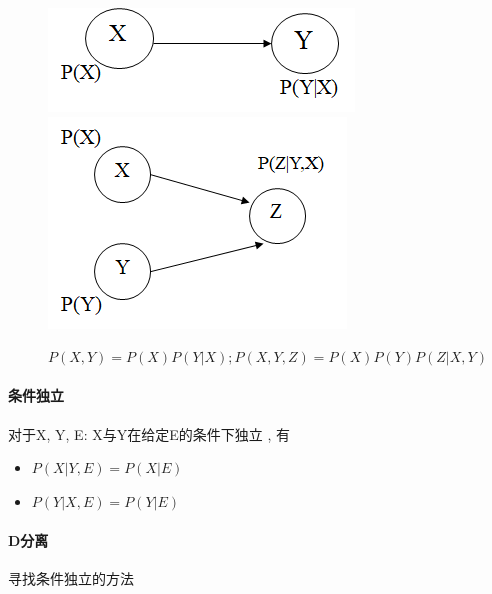 \documentclass[UTF8,a4paper]{ctexart}
\begin{document}
\begin{figure}[H]
	\centering
	\includegraphics[scale = 0.3]{assets/ArtificialIntelligence/2018-01-08-23-03-30.png}
	\includegraphics[scale = 0.3]{assets/ArtificialIntelligence/2018-01-08-23-04-22.png}
	\caption{$P(X,Y) = P(X)P(Y|X) ; P(X, Y, Z) = P(X)P(Y)P(Z|X, Y)$}
\end{figure}

\paragraph{条件独立}
对于X, Y, E: X与Y在给定E的条件下独立 , 有
\begin{itemize}
	\item $P(X|Y,E) = P(X|E)$
	\item $P(Y|X,E) = P(Y|E)$
\end{itemize}

\paragraph{D分离} 寻找条件独立的方法
\end{document}

